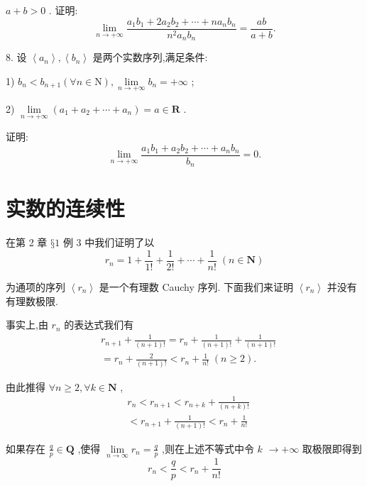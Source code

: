 $a + b > 0$ . 证明:
$$\mathop{\lim }\limits_{{n \rightarrow   + \infty }}\frac{{a}_{1}{b}_{1} + 2{a}_{2}{b}_{2} + \cdots  + n{a}_{n}{b}_{n}}{{n}^{2}{a}_{n}{b}_{n}} = \frac{ab}{a + b}.$$

8. 设 $\left\langle  {a}_{n}\right\rangle  ,\left\langle  {b}_{n}\right\rangle$ 是两个实数序列,满足条件:

1) ${b}_{n} < {b}_{n + 1}\left( {\forall n \in  \mathrm{N}}\right) ,\mathop{\lim }\limits_{{n \rightarrow   + \infty }}{b}_{n} =  + \infty$ ;

2) $\mathop{\lim }\limits_{{n \rightarrow   + \infty }}\left( {{a}_{1} + {a}_{2} + \cdots  + {a}_{n}}\right)  = a \in  \mathbf{R}$ .

证明:
$$\mathop{\lim }\limits_{{n \rightarrow   + \infty }}\frac{{a}_{1}{b}_{1} + {a}_{2}{b}_{2} + \cdots  + {a}_{n}{b}_{n}}{{b}_{n}} = 0.$$

\section{实数的连续性}

在第 2 章 $§1$ 例 3 中我们证明了以
$${r}_{n} = 1 + \frac{1}{1!} + \frac{1}{2!} + \cdots  + \frac{1}{n!}\;\left( {n \in  \mathbf{N}}\right)$$

为通项的序列 $\left\langle  {r}_{n}\right\rangle$ 是一个有理数 Cauchy 序列. 下面我们来证明 $\left\langle  {r}_{n}\right\rangle$ 并没有有理数极限.

事实上,由 ${r}_{n}$ 的表达式我们有
\begin{align*}
	&{r}_{n + 1} + \frac{1}{\left( {n + 1}\right) !} = {r}_{n} + \frac{1}{\left( {n + 1}\right) !} + \frac{1}{\left( {n + 1}\right) !}\\
	&= {r}_{n} + \frac{2}{\left( {n + 1}\right) !} < {r}_{n} + \frac{1}{n!}\;\left( {n \geq  2}\right) .
\end{align*}

由此推得 $\forall n \geq  2,\forall k \in  \mathbf{N}$ ,
\begin{align*}
	&{r}_{n} < {r}_{n + 1} < {r}_{n + k} + \frac{1}{\left( {n + k}\right) !}\\
	&< {r}_{n + 1} + \frac{1}{\left( {n + 1}\right) !} < {r}_{n} + \frac{1}{n!}
\end{align*}

如果存在 $\frac{q}{p} \in  \mathbf{Q}$ ,使得 $\mathop{\lim }\limits_{{n \rightarrow  \infty }}{r}_{n} = \frac{q}{p}$ ,则在上述不等式中令 $k$  $\rightarrow   + \infty$ 取极限即得到
$${r}_{n} < \frac{q}{p} < {r}_{n} + \frac{1}{n!}$$

